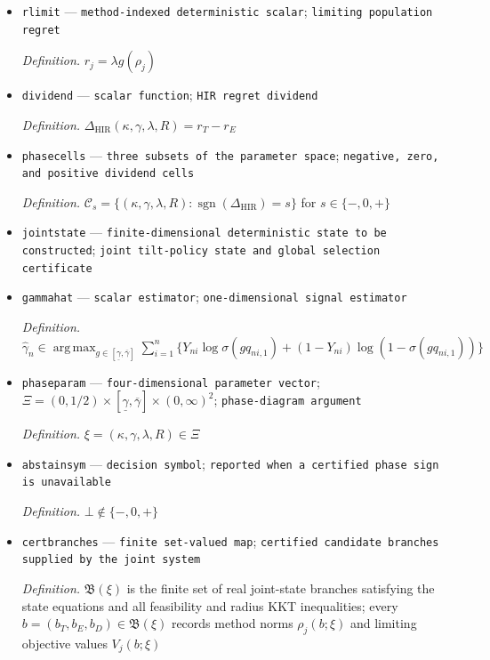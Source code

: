 \documentclass{article}
\begin{document}
\begin{itemize}
  \item \texttt{rlimit} --- \texttt{method-\allowbreak{}indexed deterministic scalar}; \texttt{limiting population regret}
  \par\smallskip\noindent\emph{Definition.} \(r_j=\lambda g(\rho_j)\)
  \item \texttt{dividend} --- \texttt{scalar function}; \texttt{HIR regret dividend}
  \par\smallskip\noindent\emph{Definition.} \(\Delta_{\mathrm{HIR}}(\kappa,\gamma,\lambda,R)=r_T-r_E\)
  \item \texttt{phasecells} --- \texttt{three subsets of the parameter space}; \texttt{negative,\allowbreak{} zero,\allowbreak{} and positive dividend cells}
  \par\smallskip\noindent\emph{Definition.} \(\mathcal C_s=\{(\kappa,\gamma,\lambda,R):\operatorname{sgn}(\Delta_{\mathrm{HIR}})=s\}\) for \(s\in\{-,0,+\}\)
  \item \texttt{jointstate} --- \texttt{finite-\allowbreak{}dimensional deterministic state to be constructed}; \texttt{joint tilt-\allowbreak{}policy state and global selection certificate}
  \item \texttt{gammahat} --- \texttt{scalar estimator}; \texttt{one-\allowbreak{}dimensional signal estimator}
  \par\smallskip\noindent\emph{Definition.} \(\widehat\gamma_n\in\operatorname*{arg\,max}_{g\in[\underline\gamma,\overline\gamma]}\sum_{i=1}^{n}\{Y_{ni}\log\sigma(gq_{ni,1})+(1-Y_{ni})\log(1-\sigma(gq_{ni,1}))\}\)
  \item \texttt{phaseparam} --- \texttt{four-\allowbreak{}dimensional parameter vector}; \(\Xi=(0,1/2)\times[\underline\gamma,\overline\gamma]\times(0,\infty)^2\); \texttt{phase-\allowbreak{}diagram argument}
  \par\smallskip\noindent\emph{Definition.} \(\xi=(\kappa,\gamma,\lambda,R)\in\Xi\)
  \item \texttt{abstainsym} --- \texttt{decision symbol}; \texttt{reported when a certified phase sign is unavailable}
  \par\smallskip\noindent\emph{Definition.} \(\bot\notin\{-,0,+\}\)
  \item \texttt{certbranches} --- \texttt{finite set-\allowbreak{}valued map}; \texttt{certified candidate branches supplied by the joint system}
  \par\smallskip\noindent\emph{Definition.} \(\mathfrak B(\xi)\) is the finite set of real joint-state branches satisfying the state equations and all feasibility and radius KKT inequalities; every \(b=(b_T,b_E,b_D)\in\mathfrak B(\xi)\) records method norms \(\rho_j(b;\xi)\) and limiting objective values \(V_j(b;\xi)\)

\end{itemize}
\end{document}
